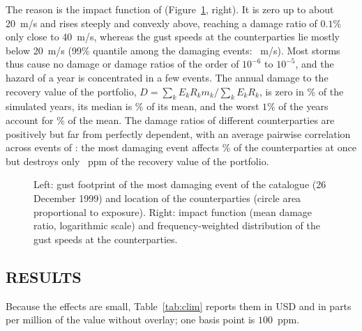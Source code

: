 The reason is the impact function of \citet{Welker21} (Figure~\ref{fig:climhaz}, right). It is zero up to about 20~m/s and rises steeply and convexly above, reaching a damage ratio of $0.1\%$ only close to 40~m/s, whereas the gust speeds at the counterparties lie mostly below 20~m/s (99\% quantile among the damaging events: ~m/s). Most storms thus cause no damage or damage ratios of the order of $10^{-6}$ to $10^{-5}$, and the hazard of a year is concentrated in a few events. The annual damage to the recovery value of the portfolio, $D=\sum_kE_kR_km_k/\sum_kE_kR_k$, is zero in \% of the simulated years, its median is \% of its mean, and the worst $1\%$ of the years account for \% of the mean. The damage ratios of different counterparties are positively but far from perfectly dependent, with an average pairwise correlation across events of : the most damaging event affects \% of the counterparties at once but destroys only ~ppm of the recovery value of the portfolio.

\begin{table}[tb]
\caption{The winter-storm catalogue at the locations of the 100 counterparties (CLIMADA \texttt{storm\_europe} hazard for Switzerland, WISC event set, impact function of \citet{Welker21}).}
\label{tab:climhaz}
\centering
{}
\end{table}

\begin{figure}[tb]
\centering
{}
\caption{Left: gust footprint of the most damaging event of the catalogue (26 December 1999) and location of the counterparties (circle area proportional to exposure). Right: impact function (mean damage ratio, logarithmic scale) and frequency-weighted distribution of the gust speeds at the counterparties.}
\label{fig:climhaz}
\end{figure}

\subsection{RESULTS}
\label{subsec:climresults}
Because the effects are small, Table~\ref{tab:clim} reports them in USD and in parts per million of the value without overlay; one basis point is $100$~ppm.

